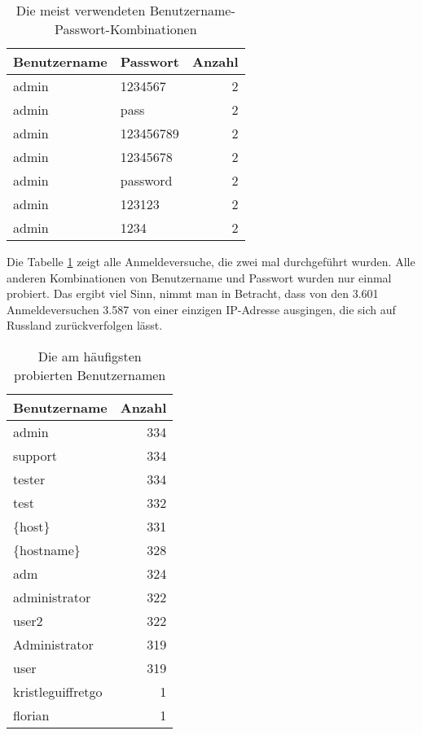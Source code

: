\begin{table}[h]
  \begin{tabular}{ l|l|r }
    \textbf{Benutzername} & \textbf{Passwort} & \textbf{Anzahl}\\
    \hline
    admin & 1234567 & 2 \\
    admin & pass & 2 \\
    admin & 123456789 & 2 \\
    admin & 12345678 & 2 \\
    admin & password & 2 \\
    admin & 123123 & 2 \\
    admin & 1234 & 2 \\
  \end{tabular}
  
  \caption{Die meist verwendeten Benutzername-Passwort-Kombinationen}
  \label{tab:maxUserPass}
\end{table}

Die Tabelle \ref{tab:maxUserPass} zeigt alle Anmeldeversuche, die zwei mal
durchgeführt wurden. Alle anderen Kombinationen von Benutzername und Passwort
wurden nur einmal probiert. Das ergibt viel Sinn, nimmt man in Betracht, dass
von den 3.601 Anmeldeversuchen 3.587 von einer einzigen IP-Adresse ausgingen,
die sich auf Russland zurückverfolgen lässt.

\begin{table}[h]
  \begin{tabular}{ l|r }
    \textbf{Benutzername} & \textbf{Anzahl}\\
    \hline
    admin & 334 \\
    support & 334 \\
    tester & 334 \\
    test & 332 \\
    \{host\} & 331 \\
    \{hostname\} & 328 \\
    adm & 324 \\
    administrator & 322 \\
    user2 & 322 \\
    Administrator & 319 \\
    user & 319 \\
    kristleguiffretgo & 1 \\
    florian & 1 \\
  \end{tabular}
  
  \caption{Die am häufigsten probierten Benutzernamen}
  \label{tab:maxUsername}
\end{table}


